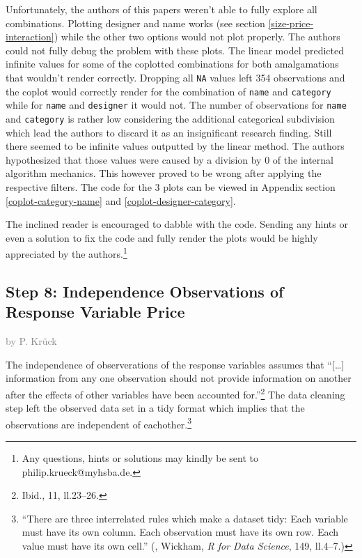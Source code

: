 \documentclass[a4paper, nobind]{templates/ociamthesis}
\begin{document}
Unfortunately, the authors of this papers weren't able to fully explore all combinations.
Plotting designer and name works (see section \ref{size-price-interaction}) while the other two options would not plot properly.
The authors could not fully debug the problem with these plots.
The linear model predicted infinite values for some of the coplotted combinations for both amalgamations that wouldn't render correctly.
Dropping all \texttt{NA} values left 354 observations and the coplot would correctly render for the combination of \texttt{name} and \texttt{category} while for \texttt{name} and \texttt{designer} it would not. The number of observations for \texttt{name} and \texttt{category} is rather low considering the additional categorical subdivision which lead the authors to discard it as an insignificant research finding.
Still there seemed to be infinite values outputted by the linear method. The authors hypothesized that those values were caused by a division by 0 of the internal algorithm mechanics. This however proved to be wrong after applying the respective filters.
The code for the 3 plots can be viewed in Appendix section \ref{coplot-category-name} and \ref{coplot-designer-category}.

The inclined reader is encouraged to dabble with the code. Sending any hints or even a solution to fix the code and fully render the plots would be highly appreciated by the authors.\footnote{Any questions, hints or solutions may kindly be sent to philip.krueck@myhsba.de.}

\hypertarget{step-8-independence-observations-of-response-variable-price}{%
\subsection{Step 8: Independence Observations of Response Variable Price}\label{step-8-independence-observations-of-response-variable-price}}

\textcolor{gray}{by P. Krück}

The independence of observerations of the response variables assumes that ``{[}\ldots{}{]} information from any one observation should not provide information on another after the effects of other variables have been accounted for.''\footnote{Ibid., 11, ll.23--26.}
The data cleaning step left the observed data set in a tidy format which implies that the observations are independent of eachother.\footnote{``There are three interrelated rules which make a dataset tidy: Each variable must have its own column. Each observation must have its own row. Each value must have its own cell.'' (, Wickham, \emph{R for Data Science}, 149, ll.4--7.)}
\end{document}
